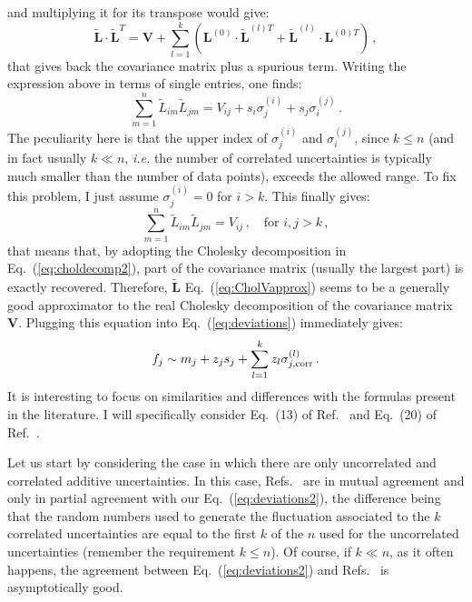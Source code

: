 \documentclass[10pt,a4paper]{article}
\begin{document}
and multiplying it for its transpose would give:
\begin{equation}
\widetilde{\mathbf{L}}\cdot \widetilde{\mathbf{L}}^T = \mathbf{V} + \sum_{l=1}^k\left(\mathbf{L}^{(0)}\cdot \widetilde{\mathbf{L}}^{(l)T}+\widetilde{\mathbf{L}}^{(l)}\cdot \mathbf{L}^{(0)T}\right)\,,
\end{equation}
that gives back the covariance matrix plus a spurious term. Writing
the expression above in terms of single entries, one finds:
\begin{equation}
\sum_{m=1}^n\widetilde{L}_{im}\widetilde{L}_{jm} = V_{ij} + s_i \sigma_{j}^{(i)}+s_j\sigma_{i}^{(j)}\,.
\end{equation}
The peculiarity here is that the upper index of $\sigma_{j}^{(i)}$ and
$\sigma_{i}^{(j)}$, since $k\leq n$ (and in fact usually $k\ll n$,
\textit{i.e.} the number of correlated uncertainties is typically much
smaller than the number of data points), exceeds the allowed range. To
fix this problem, I just assume $\sigma_{j}^{(i)}=0$ for $i>k$. This
finally gives:
\begin{equation}
\sum_{m=1}^n\widetilde{L}_{im}\widetilde{L}_{jm} = V_{ij}\,,\quad
\mbox{for } i,j>k\,,
\end{equation}
that means that, by adopting the Cholesky decomposition in
Eq.~(\ref{eq:choldecomp2}), part of the covariance matrix (usually the
largest part) is exactly recovered. Therefore,
$\widetilde{\mathbf{L}}$ Eq.~(\ref{eq:CholVapprox}) seems to be a
generally good approximator to the real Cholesky decomposition of the
covariance matrix $\mathbf{V}$. Plugging this equation into
Eq.~(\ref{eq:deviations}) immediately gives:
\begin{equation}\label{eq:deviations2}
  f_j\sim m_j+z_js_j + \sum_{l=1}^{k}z_l \sigma_{j,\rm
    corr}^{(l)}\,.
\end{equation}
It is interesting to focus on similarities and differences with the
formulas present in the literature. I will specifically consider
Eq.~(13) of Ref.~\cite{Ball:2008by} and Eq.~(20) of
Ref.~\cite{Ball:2014uwa}.

Let us start by considering the case in which there are only
uncorrelated and correlated additive uncertainties. In this case,
Refs.~\cite{Ball:2008by, Ball:2014uwa} are in mutual agreement and
only in partial agreement with our Eq.~(\ref{eq:deviations2}), the
difference being that the random numbers used to generate the
fluctuation associated to the $k$ correlated uncertainties are equal
to the first $k$ of the $n$ used for the uncorrelated uncertainties
(remember the requirement $k\leq n$). Of course, if $k\ll n$, as it
often happens, the agreement between Eq.~(\ref{eq:deviations2}) and
Refs.~\cite{Ball:2008by, Ball:2014uwa} is asymptotically good.
\end{document}
